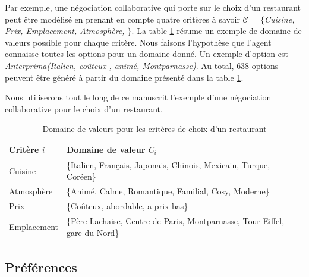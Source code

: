 		Par exemple, une négociation collaborative qui porte sur le choix d'un restaurant peut être modélisé en prenant en compte quatre critères à savoir $\mathcal{C}$ = \emph{$\{$Cuisine, Prix, Emplacement, Atmosphère, $\}$}. La table \ref{tab:domain} résume un exemple de domaine de valeurs possible pour chaque critère. Nous faisons l'hypothèse que l'agent connaisse toutes les options pour un domaine donné. Un exemple d'option est  \emph{Anterprima(Italien, coûteux , animé, Montparnasse)}. Au total, $638$ options peuvent être généré à partir du domaine présenté dans la table \ref{tab:domain}. 
		
		Nous utiliserons tout le long de ce manuscrit l'exemple d'une négociation collaborative pour le choix d'un restaurant. 
		\begin{table}[h]
			\centering
			\begin{tabular}{|p{2.25cm}|p{9.5cm}|}
				\hline
				Critère $i $ & Domaine de valeur $C_i$ \\
				\hline
				Cuisine & \{Italien, Français, Japonais, Chinois, Mexicain, Turque, Coréen\} \\
				\hline
				Atmosphère & \{Animé, Calme, Romantique, Familial, Cosy, Moderne\} \\
				\hline
				Prix & \{Coûteux, abordable, a prix bas\} \\
				\hline
				Emplacement & \{Père Lachaise, Centre de Paris, Montparnasse, Tour Eiffel, gare du Nord\} \\
				\hline
				
			\end{tabular}
			\caption{Domaine de valeurs pour les critères de choix d'un restaurant} 
			\label{tab:domain}
		\end{table}
		
		
		\subsection{Préférences}
		
